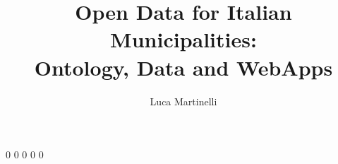 \documentclass{DEIThesis}
\title{Open Data for Italian Municipalities: \\ Ontology, Data and WebApps}
\author{Luca Martinelli}
\begin{document}
    \frontmatter

    \mainmatter
    
    {0}
    {0}
    {0} %
    {0}
    {0}
    
    \backmatter
\end{document}
